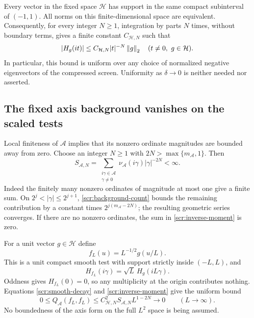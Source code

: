 Every vector in the fixed space \(\mathcal H\) has support in
the same compact subinterval of \((-1,1)\). All norms on this
finite-dimensional space are equivalent. Consequently, for every
integer \(N\ge1\), integration by parts \(N\) times, without
boundary terms, gives a finite constant \(C_{\mathcal H,N}\)
such that
\begin{equation}\label{scr:smooth-decay}
 |H_g(it)|\le C_{\mathcal H,N}|t|^{-N}\left\|g\right\|_2
       \quad(t\ne0,\ g\in\mathcal H).
\end{equation}
In particular, this bound is uniform over any choice of normalized
negative eigenvectors of the compressed screen. Uniformity as
\(\delta\to0\) is neither needed nor asserted.

\subsection{The fixed axis background vanishes on the scaled tests}

Local finiteness of \(\mathcal A\) implies that its nonzero
ordinate magnitudes are bounded away from zero. Choose an integer
\(N\ge1\) with \(2N>\max\{m_{\mathcal A},1\}\). Then
\begin{equation}\label{scr:inverse-moment}
 S_{\mathcal A,N}
    =\sum_{\substack{i\gamma\in\mathcal A\\\gamma\ne0}}
            \nu_{\mathcal A}(i\gamma)|\gamma|^{-2N}<\infty.
\end{equation}
Indeed the finitely many nonzero ordinates of magnitude at most
one give a finite sum. On \(2^j<|\gamma|\le2^{j+1}\),
\eqref{scr:background-count} bounds the remaining contribution
by a constant times \(2^{j(m_{\mathcal A}-2N)}\);
the resulting geometric series converges. If there are no
nonzero ordinates, the sum in \eqref{scr:inverse-moment} is zero.

For a unit vector \(g\in\mathcal H\) define
\[
 f_L(u)=L^{-1/2}g(u/L).
\]
This is a unit compact smooth test with support strictly inside
\((-L,L)\), and
\[
 H_{f_L}(i\gamma)=\sqrt L\,H_g(iL\gamma).
\]
Oddness gives \(H_{f_L}(0)=0\), so any multiplicity at the
origin contributes nothing. Equations \eqref{scr:smooth-decay}
and \eqref{scr:inverse-moment} give the uniform bound
\begin{equation}\label{scr:background-vanishing}
 0\le Q_{\mathcal A}(f_L,f_L)
   \le C_{\mathcal H,N}^2S_{\mathcal A,N}L^{1-2N}
      \longrightarrow0\qquad(L\longrightarrow\infty).
\end{equation}
No boundedness of the axis form on the full \(L^2\) space is
being assumed.

